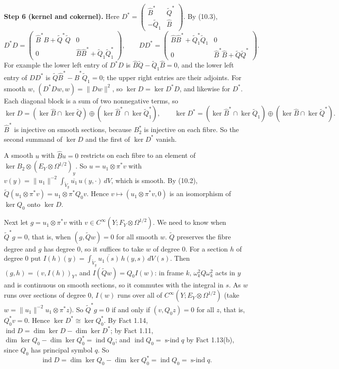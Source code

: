 \documentclass[
  11pt,
]{article}
\begin{document}
\textbf{Step 6 (kernel and cokernel).} Here
\(D^*=\begin{pmatrix}\hat B^*&\tilde Q^*\\-\tilde Q_1&\hat B\end{pmatrix}\).
By (10.3), \[
D^*D=\begin{pmatrix}\hat B^*\hat B+\tilde Q^*\tilde Q&0\\0&\hat B\hat B^*+\tilde Q_1\tilde Q_1^*\end{pmatrix},\qquad
DD^*=\begin{pmatrix}\hat B\hat B^*+\tilde Q_1^*\tilde Q_1&0\\0&\hat B^*\hat B+\tilde Q\tilde Q^*\end{pmatrix}.
\] For example the lower left entry of \(D^*D\) is
\(\hat B\tilde Q-\tilde Q_1\hat B=0\), and the lower left entry of
\(DD^*\) is \(\tilde Q\hat B^*-\hat B^*\tilde Q_1=0\); the upper right
entries are their adjoints. For smooth \(w\), \((D^*Dw,w)=\|Dw\|^2\), so
\(\ker D=\ker D^*D\), and likewise for \(D^*\). Each diagonal block is a
sum of two nonnegative terms, so \[
\ker D=(\ker\hat B\cap\ker\tilde Q)\oplus(\ker\hat B^*\cap\ker\tilde Q_1^*),\qquad
\ker D^*=(\ker\hat B^*\cap\ker\tilde Q_1)\oplus(\ker\hat B\cap\ker\tilde Q^*).
\] \(\hat B^*\) is injective on smooth sections, because \(B_2^*\) is
injective on each fibre. So the second summand of \(\ker D\) and the
first of \(\ker D^*\) vanish.

A smooth \(u\) with \(\hat Bu=0\) restricts on each fibre to an element
of \(\ker B_2\otimes(E_Y\otimes\Omega^{1/2})_y\). So
\(u=u_1\otimes\pi^*v\) with
\(v(y)=\|u_1\|^{-2}\int_{\tilde V_y}\overline{u_1}\,u(y,\cdot)\,dV\),
which is smooth. By (10.2),
\(\tilde Q(u_1\otimes\pi^*v)=u_1\otimes\pi^*Q_0v\). Hence
\(v\mapsto(u_1\otimes\pi^*v,0)\) is an isomorphism of \(\ker Q_0\) onto
\(\ker D\).

Next let \(g=u_1\otimes\pi^*v\) with
\(v\in C^\infty(Y;F_Y\otimes\Omega^{1/2})\). We need to know when
\(\tilde Q^*g=0\), that is, when \((g,\tilde Qw)=0\) for all smooth
\(w\). \(\tilde Q\) preserves the fibre degree and \(g\) has degree
\(0\), so it suffices to take \(w\) of degree \(0\). For a section \(h\)
of degree \(0\) put
\(I(h)(y)=\int_{\tilde V_y}\overline{u_1(s)}\,h(y,s)\,dV(s)\). Then
\((g,h)=(v,I(h))_Y\), and \(I(\tilde Qw)=Q_0I(w)\): in frame \(k\),
\(\omega_k^2Q\omega_k^2\) acts in \(y\) and is continuous on smooth
sections, so it commutes with the integral in \(s\). As \(w\) runs over
sections of degree \(0\), \(I(w)\) runs over all of
\(C^\infty(Y;E_Y\otimes\Omega^{1/2})\) (take
\(w=\|u_1\|^{-2}u_1\otimes\pi^*z\)). So \(\tilde Q^*g=0\) if and only if
\((v,Q_0z)=0\) for all \(z\), that is, \(Q_0^*v=0\). Hence
\(\ker D^*\cong\ker Q_0^*\). By Fact 1.14,
\(\operatorname{ind}D=\dim\ker D-\dim\ker D^*\); by Fact 1.11,
\(\dim\ker Q_0-\dim\ker Q_0^*=\operatorname{ind}Q_0\); and
\(\operatorname{ind}Q_0=\operatorname{s-ind}q\) by Fact 1.13(b), since
\(Q_0\) has principal symbol \(q\). So \[
\operatorname{ind}D=\dim\ker Q_0-\dim\ker Q_0^*=\operatorname{ind}Q_0=\operatorname{s-ind}q .
\tag{10.7}
\]
\end{document}
